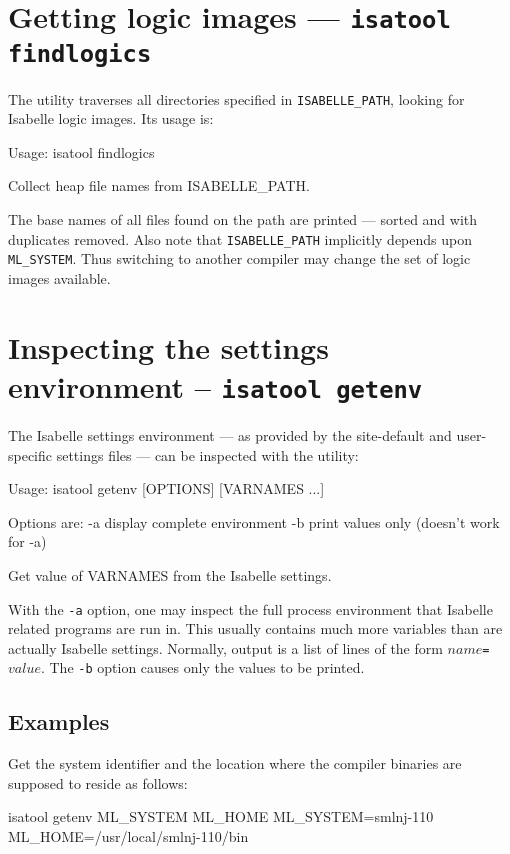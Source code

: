 \section{Getting logic images --- \texttt{isatool findlogics}}

The  utility traverses all directories specified in
\texttt{ISABELLE_PATH}, looking for Isabelle logic images. Its usage
is:
\begin{ttbox}
Usage: isatool findlogics

  Collect heap file names from ISABELLE_PATH.
\end{ttbox}
The base names of all files found on the path are printed --- sorted
and with duplicates removed. Also note that \texttt{ISABELLE_PATH}
implicitly depends upon \texttt{ML_SYSTEM}. Thus switching to another
{\ML} compiler may change the set of logic images available.


\section{Inspecting the settings environment -- \texttt{isatool getenv}}
\label{sec:tool-getenv}

The Isabelle settings environment --- as provided by the site-default
and user-specific settings files --- can be inspected with the
 utility:
\begin{ttbox}
Usage: isatool getenv [OPTIONS] [VARNAMES ...]

  Options are:
    -a           display complete environment
    -b           print values only (doesn't work for -a)

  Get value of VARNAMES from the Isabelle settings.
\end{ttbox}

With the \texttt{-a} option, one may inspect the full process
environment that Isabelle related programs are run in. This usually
contains much more variables than are actually Isabelle settings.
Normally, output is a list of lines of the form
\mbox{$name$\texttt{=}$value$}. The \texttt{-b} option causes only the
values to be printed.


\subsection*{Examples}

Get the {\ML} system identifier and the location where the compiler
binaries are supposed to reside as follows:
\begin{ttbox}
isatool getenv ML_SYSTEM ML_HOME
{\out ML_SYSTEM=smlnj-110}
{\out ML_HOME=/usr/local/smlnj-110/bin}
\end{ttbox}

